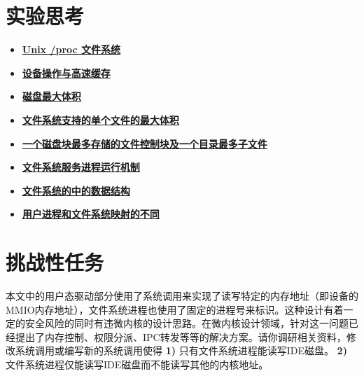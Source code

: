 \section{实验思考}

\begin{itemize}
\item \hyperref[think-proc]{\textbf{\textcolor{baseB}{Unix /proc 文件系统}}}
\item \hyperref[think-fs-cache]{\textbf{\textcolor{baseB}{设备操作与高速缓存}}}
\item \hyperref[think-disksize]{\textbf{\textcolor{baseB}{磁盘最大体积}}}
\item \hyperref[think-filesize]{\textbf{\textcolor{baseB}{文件系统支持的单个文件的最大体积}}}
\item \hyperref[think-filenum]{\textbf{\textcolor{baseB}{一个磁盘块最多存储的文件控制块及一个目录最多子文件}}}
\item \hyperref[think-fs-serve]{\textbf{\textcolor{baseB}{文件系统服务进程运行机制}}}
\item \hyperref[think-structures]{\textbf{\textcolor{baseB}{文件系统的中的数据结构}}}
\item \hyperref[think-fileid]{\textbf{\textcolor{baseB}{用户进程和文件系统映射的不同}}}
\end{itemize}


\section{挑战性任务}

本文中的用户态驱动部分使用了系统调用来实现了读写特定的内存地址（即设备的MMIO内存地址），文件系统进程也使用了固定的进程号来标识。这种设计有着一定的安全风险的同时有违微内核的设计思路。在微内核设计领域，针对这一问题已经提出了内存控制、权限分派、IPC转发等等的解决方案。请你调研相关资料，修改系统调用或编写新的系统调用使得 \textbf{1)} 只有文件系统进程能读写IDE磁盘。 \textbf{2)} 文件系统进程仅能读写IDE磁盘而不能读写其他的内核地址。




